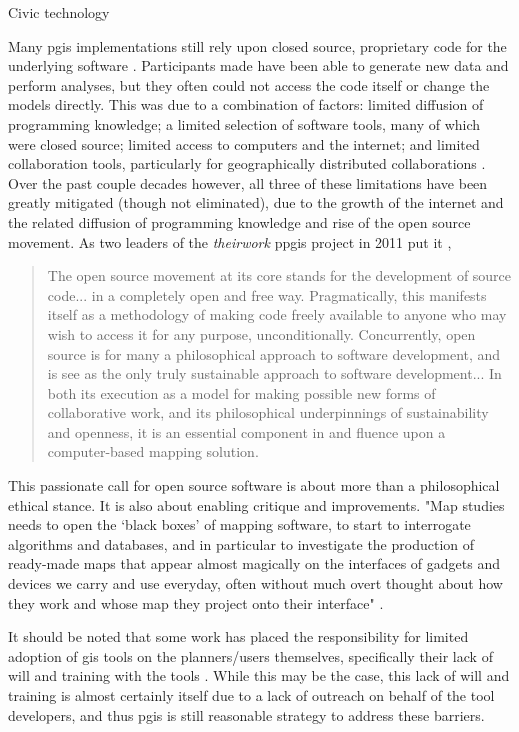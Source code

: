 Civic technology \cite{poppertNavigatingFieldCivic2021}

Many \ac{pgis} implementations still rely upon closed source, proprietary code for the underlying software \cite{heikkilaGISDeadLong1998}. Participants made have been able to generate new data and perform analyses, but they often could not access the code itself or change the models directly. This was due to a combination of factors: limited diffusion of programming knowledge; a limited selection of software tools, many of which were closed source; limited access to computers and the internet; and limited collaboration tools, particularly for geographically distributed collaborations \cite{cramptonIntroductionCriticalCartography2005}. Over the past couple decades however, all three of these limitations have been greatly mitigated (though not eliminated), due to the growth of the internet and the related diffusion of programming knowledge and rise of the open source movement. As two leaders of the \textit{theirwork} \ac{ppgis} project in 2011 put it \cite{williamsonTheirworkDevelopmentSustainable2011}, 

\blockquote{The open source movement at its core stands for the development of source code... in a completely open and free way. Pragmatically, this manifests itself as a methodology of making code freely available to anyone who may wish to access it for any purpose, unconditionally. Concurrently, open source is for many a philosophical approach to software development, and is see as the only truly sustainable approach to software development... In both its execution as a model for making possible new forms of collaborative work, and its philosophical underpinnings of sustainability and openness, it is an essential component in and fluence upon a computer-based mapping solution.}

This passionate call for open source software is about more than a philosophical ethical stance. It is also about enabling critique and improvements. "Map studies needs to open the `black boxes' of mapping software, to start to interrogate algorithms and databases, and in particular to investigate the production of ready-made maps that appear almost magically on the interfaces of gadgets and devices we carry and use everyday, often without much overt thought about how they work and whose map they project onto their interface" \cite{dodgeMappingModesMethods2011}.

It should be noted that some work has placed the responsibility for limited adoption of \ac{gis} tools on the planners/users themselves, specifically their lack of will and training with the tools \cite{gocmenBarriersGISUse2010}. While this may be the case, this lack of will and training is almost certainly itself due to a lack of outreach on behalf of the tool developers, and thus \ac{pgis} is still reasonable strategy to address these barriers.	 


